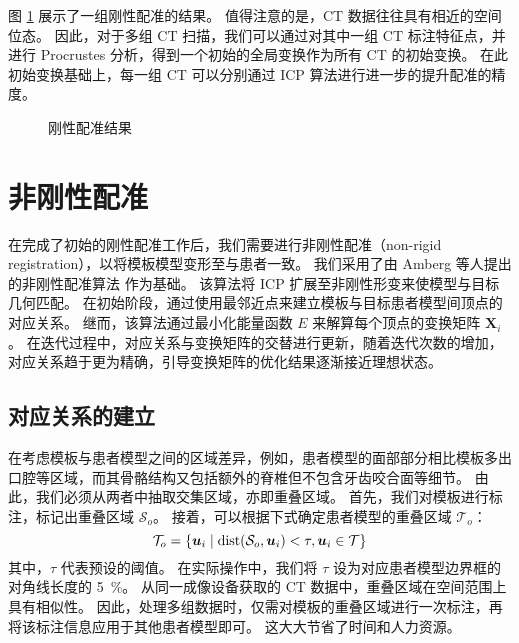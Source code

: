 图 \ref{fig:align} 展示了一组刚性配准的结果。
值得注意的是，CT 数据往往具有相近的空间位态。
因此，对于多组 CT 扫描，我们可以通过对其中一组 CT 标注特征点，并进行 Procrustes 分析，得到一个初始的全局变换作为所有 CT 的初始变换。
在此初始变换基础上，每一组 CT 可以分别通过 ICP 算法进行进一步的提升配准的精度。

\begin{figure}
  \centering
  \caption{刚性配准结果}
  \label{fig:align}
\end{figure}

\section{非刚性配准}

在完成了初始的刚性配准工作后，我们需要进行非刚性配准（non-rigid registration），以将模板模型变形至与患者一致。
我们采用了由 Amberg 等人提出的非刚性配准算法 \cite{ambergOptimalStepNonrigid2007} 作为基础。
该算法将 ICP 扩展至非刚性形变来使模型与目标几何匹配。
在初始阶段，通过使用最邻近点来建立模板与目标患者模型间顶点的对应关系。
继而，该算法通过最小化能量函数 $E$ 来解算每个顶点的变换矩阵 $\bm{X}_i$。
在迭代过程中，对应关系与变换矩阵的交替进行更新，随着迭代次数的增加，对应关系趋于更为精确，引导变换矩阵的优化结果逐渐接近理想状态。

\subsection{对应关系的建立}

在考虑模板与患者模型之间的区域差异，例如，患者模型的面部部分相比模板多出口腔等区域，而其骨骼结构又包括额外的脊椎但不包含牙齿咬合面等细节。
由此，我们必须从两者中抽取交集区域，亦即重叠区域。
首先，我们对模板进行标注，标记出重叠区域 $\mathcal{S}_o$。
接着，可以根据下式确定患者模型的重叠区域 $\mathcal{T}_o$：
\begin{equation}
  \mathcal{T}_o = \Bqty{\bm{u}_i \mid \dist(\mathcal{S}_o, \bm{u}_i) < \tau, \bm{u}_i \in \mathcal{T}}
\end{equation}
其中，$\tau$ 代表预设的阈值。
在实际操作中，我们将 $\tau$ 设为对应患者模型边界框的对角线长度的 \SI{5}{\percent}。
从同一成像设备获取的 CT 数据中，重叠区域在空间范围上具有相似性。
因此，处理多组数据时，仅需对模板的重叠区域进行一次标注，再将该标注信息应用于其他患者模型即可。
这大大节省了时间和人力资源。

